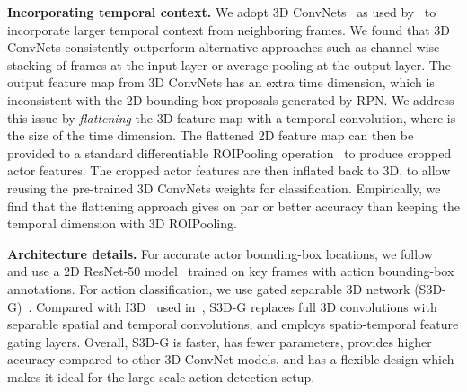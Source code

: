 \documentclass[runningheads]{llncs}
\begin{document}
\medskip\noindent\textbf{Incorporating temporal context.} We adopt 3D ConvNets~\cite{i3d_cvpr17,s3dg_2017} as used by~\cite{ava_cvpr18} to incorporate larger temporal context from neighboring frames. We found that 3D ConvNets consistently outperform alternative approaches such as channel-wise stacking of frames at the input layer or average pooling at the output layer. The output feature map from 3D ConvNets has an extra time dimension, which is inconsistent with the 2D bounding box proposals generated by RPN. We address this issue by \textit{flattening} the 3D feature map with a  temporal convolution, where  is the size of the time dimension. The flattened 2D feature map can then be provided to a standard differentiable ROIPooling operation~\cite{STN,huang2016coco} to produce cropped actor features. The cropped actor features are then inflated back to 3D, to allow reusing the pre-trained 3D ConvNets weights for classification. Empirically, we find that the flattening approach gives on par or better accuracy than keeping the temporal dimension with 3D ROIPooling.

\medskip\noindent\textbf{Architecture details.} For accurate actor bounding-box locations, we follow~\cite{ava_cvpr18} and use a 2D ResNet-50 model~\cite{he2016resnet} trained on key frames with action bounding-box annotations. For action classification, we use gated separable 3D network (S3D-G)~\cite{s3dg_2017}. Compared with I3D~\cite{i3d_cvpr17} used in~\cite{ava_cvpr18}, S3D-G replaces full 3D convolutions with separable spatial and temporal convolutions, and employs spatio-temporal feature gating layers. Overall, S3D-G is faster, has fewer parameters, provides higher accuracy compared to other 3D ConvNet models, and has a flexible design which makes it ideal for the large-scale action detection setup.
\end{document}
